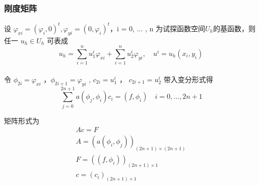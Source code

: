 \documentclass[a4paper,UTF8,titlepage]{ctexart}
\begin{document}
	
%
%	
%	

\subsubsection{刚度矩阵}

设 $\varphi_{xi} = (\varphi_i, 0)^t, \varphi_{yi} = (0,\varphi_i)^t$，i = 0, ... , n 为试探函数空间$U_h$的基函数，则任一 $u_h \in U_h$ 可表成
$$
	u_h = \sum\limits_{i=1}^n u^{i}_1 \varphi_{xi} + \sum\limits_{i=1}^n u^{i}_2 \varphi_{yi}, \quad u^i = u_h(x_i,y_i)
$$ 
\\ 
令 $\phi_{2i} = \varphi_{xi}$ ，$\phi_{2i+1} = \varphi_{yi}$ , $c_{2i} = u^i_1$ ， $c_{2i+1} = u^i_2$
带入变分形式得
$$
	\sum\limits_{j=0}^{2n+1} a(\phi_j, \phi_i) c_i = (f,\phi_i) \quad i=0, ... ,2n+1
$$

矩阵形式为
$$
\begin{matrix}
	A c = F \\
	A = (a(\phi_i, \phi_j))_{(2n+1) \times (2n+1)} \\
	F = ((f,\phi_i))_{(2n+1) \times 1} \\
	c = (c_i)_{(2n+1) \times 1}
\end{matrix}
$$

%
%
\end{document}
